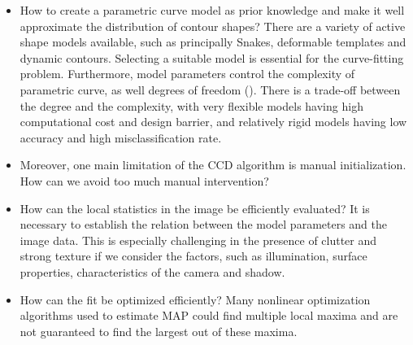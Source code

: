 \begin{itemize}
\item How to create a parametric curve model as prior knowledge and
  make it well approximate the distribution of contour shapes? 
There are a variety of active shape models available, such as principally Snakes,
  deformable templates and dynamic contours. Selecting a suitable model
  is essential for the curve-fitting
  problem. Furthermore, 
  model parameters control the complexity of parametric curve,
  as well degrees of freedom (). There is a trade-off between the
  degree and the complexity, with very flexible models having high
  computational cost and design barrier, and relatively rigid models
  having low accuracy and high misclassification rate. 

\item Moreover, one
  main limitation of the CCD algorithm is manual initialization. How can
  we avoid too much manual intervention?

\item How can the local statistics in the image be efficiently
  evaluated? It is necessary to establish the relation between the
  model parameters
  and the image data. This is especially challenging in the presence
  of clutter and strong texture if we consider the factors, such as
  illumination, surface properties, characteristics of the camera and
  shadow. 

\item How can the fit be optimized efficiently? Many
  nonlinear optimization algorithms used to estimate MAP could find
  multiple local maxima and are not guaranteed to find the largest
  out of these maxima.
\end{itemize}

